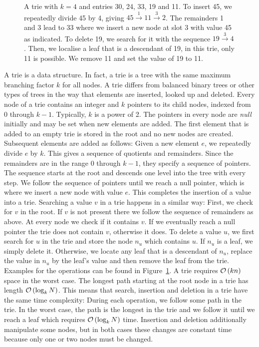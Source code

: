 \begin{figure}
	\centering
	
	\caption{ \small A trie with $k = 4$ and entries 30, 24, 33, 19 and 11.
		To insert 45, we repeatedly divide 45 by 4, giving
			$45 \overset{1}{\longrightarrow} 11  \overset{3}{\longrightarrow} 2$.
		The remainders 1 and 3 lead to 33 where we insert a new node at slot 3 with value 45 as indicated.
		To delete 19, we search for it with the sequence $19 \overset{3}{\longrightarrow} 4$.
		Then, we localise a leaf that is a descendant of 19, in this trie, only 11 is possible.
		We remove 11 and set the value of 19 to 11.
		\label{fig:trie}}
\end{figure}


A trie \cite{knuth:tries} is a data structure.
In fact, a trie is a tree with the same maximum branching factor $k$ for all nodes.
A trie differs from balanced binary trees or other types of trees in the way that elements are inserted, looked up and deleted.
Every node of a trie contains an integer and $k$ pointers to its child nodes, indexed from 0 through $k - 1$.
Typically, $k$ is a power of 2.
The pointers in every node are \emph{null} initially and may be set when new elements are added.
The first element that is added to an empty trie is stored in the root and no new nodes are created.
Subsequent elements are added as follows:
Given a new element $e$, we repeatedly divide $e$ by $k$.
This gives a sequence of quotients and remainders.
Since the remainders are in the range 0 through $k - 1$, they specify a sequence of pointers.
The sequence starts at the root and descends one level into the tree with every step.
We follow the sequence of pointers until we reach a null pointer, which is where we insert a new node with value $e$.
This completes the insertion of a value into a trie.
Searching a value $v$ in a trie happens in a similar way:
First, we check for $v$ in the root.
If $v$ is not present there we follow the sequence of remainders as above.
At every node we check if it contains $v$.
If we eventually reach a null pointer the trie does not contain $v$, otherwise it does.
To delete a value $u$, we first search for $u$ in the trie and store the node $n_u$ which contains $u$.
If $n_u$ is a leaf, we simply delete it.
Otherwise, we locate any leaf that is a descendant of $n_u$, replace the value in $n_u$ by the leaf's value and then remove the leaf from the trie.
Examples for the operations can be found in Figure~\ref{fig:trie}.
A trie requires $\mathcal{O}\left(kn\right)$ space in the worst case.
The longest path starting at the root node in a trie has length $\mathcal{O}\left(\log_k N\right)$.
This means that search, insertion and deletion in a trie have the same time complexity:
During each operation, we follow some path in the trie.
In the worst case, the path is the longest in the trie and we follow it until we reach a leaf which requires $\mathcal{O}\left(\log_k N\right)$ time.
Insertion and deletion additionally manipulate some nodes, but in both cases these changes are constant time because only one or two nodes must be changed.
